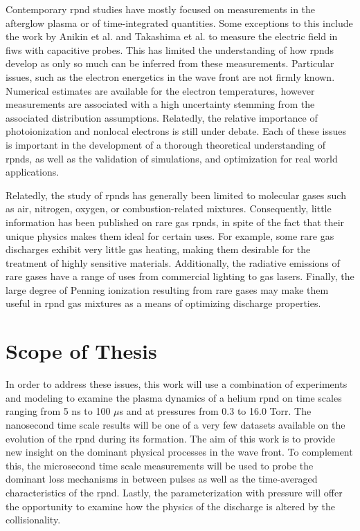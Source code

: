 Contemporary \acs{rpnd} studies have mostly focused on measurements in the
afterglow plasma or of time-integrated quantities. Some exceptions to this
include the work by Anikin et al. \cite{Anikin1998} and Takashima et al.
\cite{Takashima2011} to measure the electric field in \acs{fiw}s with capacitive
probes. This has limited the understanding of how \acs{rpnd}s develop as only so
much can be inferred from these measurements. Particular issues, such as the
electron energetics in the wave front are not firmly known. Numerical estimates
are available for the electron temperatures, however measurements are associated
with a high uncertainty stemming from the associated distribution assumptions.
Relatedly, the relative importance of photoionization and nonlocal electrons is
still under debate. Each of these issues is important in the development of a
thorough theoretical understanding of \acs{rpnd}s, as well as the validation of
simulations, and optimization for real world applications.

Relatedly, the study of \acs{rpnd}s has generally been limited to molecular
gases such as air, nitrogen, oxygen, or combustion-related mixtures.
Consequently, little information has been published on rare gas \acs{rpnd}s, in
spite of the fact that their unique physics makes them ideal for certain uses.
For example, some rare gas discharges exhibit very little gas heating, making
them desirable for the treatment of highly sensitive materials. Additionally,
the radiative emissions of rare gases have a range of uses from commercial
lighting to gas lasers. Finally, the large degree of Penning ionization
resulting from rare gases may make them useful in \acs{rpnd} gas mixtures as a
means of optimizing discharge properties.

\section{Scope of Thesis}

In order to address these issues, this work will use a combination of
experiments and modeling to examine the plasma dynamics of a helium \acs{rpnd}
on time scales ranging from 5 ns to 100 $\mu$s and at pressures from 0.3 to 16.0
Torr. The nanosecond time scale results will be one of a very few datasets
available on the evolution of the \acs{rpnd} during its formation. The aim of
this work is to provide new insight on the dominant physical processes in the
wave front. To complement this, the microsecond time scale measurements will
be used to probe the dominant loss mechanisms in between pulses as well as the
time-averaged characteristics of the \acs{rpnd}. Lastly, the parameterization
with pressure will offer the opportunity to examine how the physics of the discharge
is altered by the collisionality.

